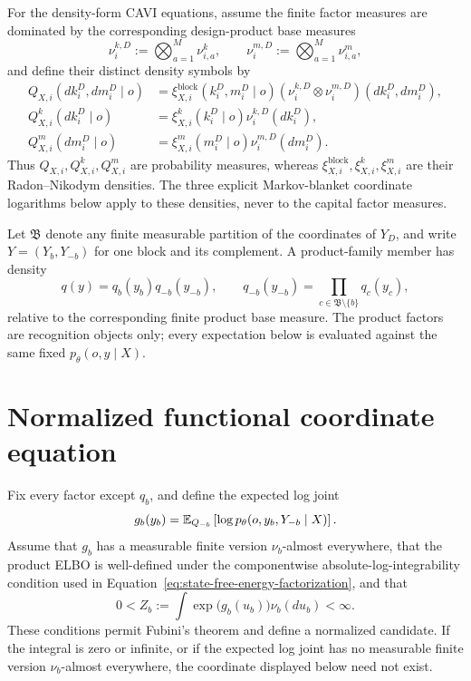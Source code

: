 For the density-form CAVI equations, assume the finite factor measures are dominated by the corresponding design-product base measures
\begin{equation}
\nu_i^{k,D}:=\bigotimes_{a=1}^{M}\nu_{i,a}^{k},
\qquad
\nu_i^{m,D}:=\bigotimes_{a=1}^{M}\nu_{i,a}^{m},
\label{eq:mean-field-factor-base-measures}
\end{equation}
and define their distinct density symbols by
\begin{align}
Q_{X,i}(dk_i^D,dm_i^D\mid o)
&=\xi^{\mathrm{block}}_{X,i}(k_i^D,m_i^D\mid o)
\left(\nu_i^{k,D}\otimes\nu_i^{m,D}\right)(dk_i^D,dm_i^D),
\label{eq:agent-block-factor-density}\\
Q^k_{X,i}(dk_i^D\mid o)
&=\xi^k_{X,i}(k_i^D\mid o)\nu_i^{k,D}(dk_i^D),
\label{eq:state-factor-density}\\
Q^m_{X,i}(dm_i^D\mid o)
&=\xi^m_{X,i}(m_i^D\mid o)\nu_i^{m,D}(dm_i^D).
\label{eq:model-factor-density}
\end{align}
Thus \(Q_{X,i},Q^k_{X,i},Q^m_{X,i}\) are probability measures, whereas \(\xi^{\mathrm{block}}_{X,i},\xi^k_{X,i},\xi^m_{X,i}\) are their Radon--Nikodym densities. The three explicit Markov-blanket coordinate logarithms below apply to these densities, never to the capital factor measures.

Let \(\mathfrak B\) denote any finite measurable partition of the coordinates of \(Y_D\), and write \(Y=(Y_b,Y_{-b})\) for one block and its complement. A product-family member has density
\begin{equation}
q(y)=q_b(y_b)q_{-b}(y_{-b}),
\qquad
q_{-b}(y_{-b})=\prod_{c\in\mathfrak B\setminus\{b\}}q_c(y_c),
\label{eq:generic-product-recognition-density}
\end{equation}
relative to the corresponding finite product base measure. The product factors are recognition objects only; every expectation below is evaluated against the same fixed \(p_\theta(o,y\mid X)\).

\section{Normalized functional coordinate equation}

Fix every factor except \(q_b\), and define the expected log joint
\begin{equation}
g_b(y_b)
=\mathbb E_{Q_{-b}}\left[\log p_\theta(o,y_b,Y_{-b}\mid X)\right].
\label{eq:cavi-expected-log-joint}
\end{equation}
Assume that \(g_b\) has a measurable finite version \(\nu_b\)-almost everywhere, that the product ELBO is well-defined under the componentwise absolute-log-integrability condition used in Equation~\eqref{eq:state-free-energy-factorization}, and that
\begin{equation}
0<Z_b
:=\int \exp\bigl(g_b(u_b)\bigr)\nu_b(du_b)<\infty.
\label{eq:cavi-coordinate-existence}
\end{equation}
These conditions permit Fubini's theorem and define a normalized candidate. If the integral is zero or infinite, or if the expected log joint has no measurable finite version \(\nu_b\)-almost everywhere, the coordinate displayed below need not exist.

